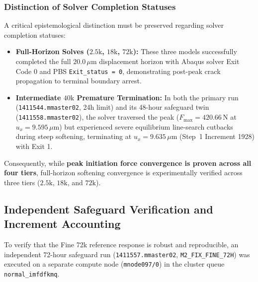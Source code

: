 \subsubsection{Distinction of Solver Completion Statuses}
A critical epistemological distinction must be preserved regarding solver completion statuses:
\begin{itemize}
  \item \textbf{Full-Horizon Solves ($2.5\mathrm{k}$, $18\mathrm{k}$, $72\mathrm{k}$):} These three models successfully completed the full $20.0\,\mu\mathrm{m}$ displacement horizon with Abaqus solver Exit Code 0 and PBS \texttt{Exit\_status = 0}, demonstrating post-peak crack propagation to terminal boundary arrest.
  \item \textbf{Intermediate $40\mathrm{k}$ Premature Termination:} In both the primary run (\texttt{1411544.mmaster02}, 24h limit) and its 48-hour safeguard twin (\texttt{1411558.mmaster02}), the solver traversed the peak ($F_{\max} = 420.66\,\mathrm{N}$ at $u_x = 9.595\,\mu\mathrm{m}$) but experienced severe equilibrium line-search cutbacks during steep softening, terminating at $u_x = 9.635\,\mu\mathrm{m}$ (Step~1 Increment 1928) with Exit 1.
\end{itemize}
Consequently, while \textbf{peak initiation force convergence is proven across all four tiers}, full-horizon softening convergence is experimentally verified across three tiers ($2.5\mathrm{k}$, $18\mathrm{k}$, and $72\mathrm{k}$).

\subsection{Independent Safeguard Verification and Increment Accounting}
\label{subsec:mode2_safeguard_verification}

To verify that the Fine 72k reference response is robust and reproducible, an independent 72-hour safeguard run (\texttt{1411557.mmaster02}, \texttt{M2\_FIX\_FINE\_72H}) was executed on a separate compute node (\texttt{mnode097/0}) in the cluster queue \texttt{normal\_imfdfkmq}.

